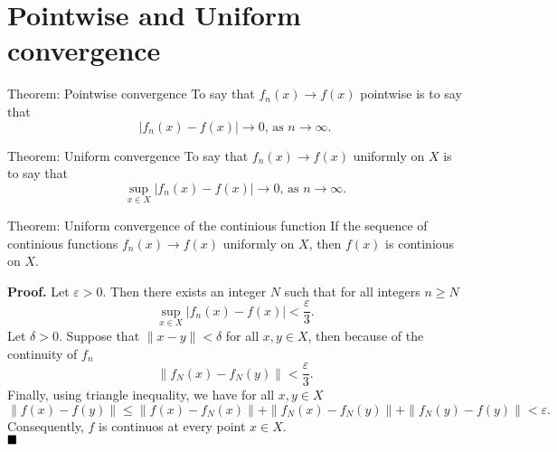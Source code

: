 \documentclass[10pt]{beamer}
\renewcommand{\qed}{\hfill\blacksquare}
\begin{document}
\section{Pointwise and Uniform convergence}
\begin{frame}
  \begin{block}{Theorem: Pointwise convergence}
    To say that \(f_n(x) \rightarrow f(x)\) pointwise is to say that
    \[|f_n(x) - f(x)| \rightarrow 0 \text{, as } n \rightarrow \infty.\]
  \end{block}

  \begin{block}{Theorem: Uniform convergence}
    To say that \(f_n(x) \rightarrow f(x)\) uniformly on \(X\) is to say that
    \[\sup_{x \in X}|f_n(x) - f(x)| \rightarrow 0 \text{, as } n \rightarrow \infty.\]
  \end{block}
\end{frame}

\begin{frame}
  \begin{block}{Theorem: Uniform convergence of the continious function}
    If the sequence of continious functions \(f_n(x) \rightarrow f(x)\) uniformly on \(X\),
    then \(f(x)\) is continious on \(X\).
  \end{block}

  \textbf{Proof.} Let \(\varepsilon > 0\). Then there exists an integer \(N\) such that
  for all integers \(n \ge N\)
  \[\sup_{x \in X}|f_n(x) - f(x)| < \frac{\varepsilon}{3}.\]
  Let \(\delta > 0\). Suppose that \(\|x - y\| < \delta\) for all \(x, y \in X\), then because of the continuity of \(f_n\)
  \[\|f_N(x) - f_N(y)\| < \frac{\varepsilon}{3}.\]
  Finally, using triangle inequality, we have for all \(x, y \in X\)
  \[\|f(x) - f(y)\| \le \|f(x) - f_N(x)\| + \|f_N(x) - f_N(y)\| + \|f_N(y) - f(y)\| < \varepsilon.\]
  Consequently, \(f\) is continuos at every point \(x \in X\). \\ \(\qed\)
\end{frame}
\end{document}
